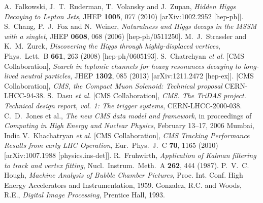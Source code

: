 \documentclass{JINST}
\begin{document}
\begin{thebibliography}{9}
%
%
  A.~Falkowski, J.~T.~Ruderman, T.~Volansky and J.~Zupan,
  \emph{Hidden Higgs Decaying to Lepton Jets},
  JHEP {\bf 1005}, 077 (2010)
  [arXiv:1002.2952 [hep-ph]].
%
%
  S.~Chang, P.~J.~Fox and N.~Weiner,
  \emph{Naturalness and Higgs decays in the MSSM with a singlet},
  JHEP {\bf 0608}, 068 (2006)
  [hep-ph/0511250].
%
%
  M.~J.~Strassler and K.~M.~Zurek,
\emph{Discovering the Higgs through highly-displaced vertices},
  Phys.\ Lett.\ B {\bf 661}, 263 (2008)
  [hep-ph/0605193].
%
%
  S.~Chatrchyan {\it et al.}  [CMS Collaboration],
  \emph{Search in leptonic channels for heavy resonances decaying to long-lived neutral particles},
  JHEP {\bf 1302}, 085 (2013)
  [arXiv:1211.2472 [hep-ex]].
%
%
  [CMS Collaboration],
\emph{CMS, the Compact Muon Solenoid: Technical proposal}
  CERN-LHCC-94-38.
%
%
  S.~Dasu {\it et al.}  [CMS Collaboration],
\emph{CMS. The TriDAS project. Technical design report, vol. 1: The trigger systems},
  CERN-LHCC-2000-038.
%
%
C.~D.~Jones et al.,
\emph{The new CMS data model and framework}, in proceedings of
 \emph{Computing in High Energy and Nuclear Physics}, 
February 13--17, 2006 Mumbai, India
%
%
  V.~Khachatryan {\it et al.}  [CMS Collaboration],
  \emph{CMS Tracking Performance Results from early LHC Operation},
  Eur.\ Phys.\ J.\ C {\bf 70}, 1165 (2010)
  [arXiv:1007.1988 [physics.ins-det]].
%
%
  R.~Fruhwirth,
  \emph{Application of Kalman filtering to track and vertex fitting},
  Nucl.\ Instrum.\ Meth.\ A {\bf 262}, 444 (1987).
%
P.~V.~C. Hough, 
\emph{Machine Analysis of Bubble Chamber Pictures}, 
Proc. Int. Conf. High Energy Accelerators and Instrumentation, 1959.
%
%
 Gonzalez, R.C. and Woods, R.E., 
\emph{Digital Image Processing},
Prentice Hall, 1993.

\end{thebibliography}
\end{document}
